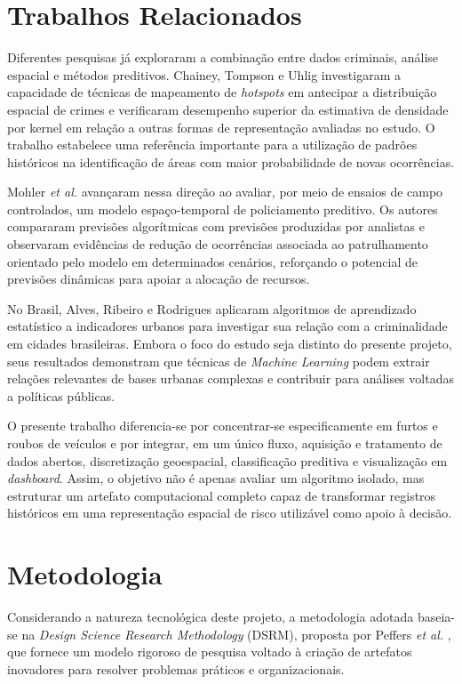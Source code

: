 \documentclass[12pt]{article}
\begin{document}
\section{Trabalhos Relacionados}
Diferentes pesquisas já exploraram a combinação entre dados criminais, análise espacial e métodos preditivos. Chainey, Tompson e Uhlig \cite{chainey2008} investigaram a capacidade de técnicas de mapeamento de \textit{hotspots} em antecipar a distribuição espacial de crimes e verificaram desempenho superior da estimativa de densidade por kernel em relação a outras formas de representação avaliadas no estudo. O trabalho estabelece uma referência importante para a utilização de padrões históricos na identificação de áreas com maior probabilidade de novas ocorrências.

Mohler \textit{et al.} \cite{mohler2015} avançaram nessa direção ao avaliar, por meio de ensaios de campo controlados, um modelo espaço-temporal de policiamento preditivo. Os autores compararam previsões algorítmicas com previsões produzidas por analistas e observaram evidências de redução de ocorrências associada ao patrulhamento orientado pelo modelo em determinados cenários, reforçando o potencial de previsões dinâmicas para apoiar a alocação de recursos.

No Brasil, Alves, Ribeiro e Rodrigues \cite{alves2018} aplicaram algoritmos de aprendizado estatístico a indicadores urbanos para investigar sua relação com a criminalidade em cidades brasileiras. Embora o foco do estudo seja distinto do presente projeto, seus resultados demonstram que técnicas de \textit{Machine Learning} podem extrair relações relevantes de bases urbanas complexas e contribuir para análises voltadas a políticas públicas.

O presente trabalho diferencia-se por concentrar-se especificamente em furtos e roubos de veículos e por integrar, em um único fluxo, aquisição e tratamento de dados abertos, discretização geoespacial, classificação preditiva e visualização em \textit{dashboard}. Assim, o objetivo não é apenas avaliar um algoritmo isolado, mas estruturar um artefato computacional completo capaz de transformar registros históricos em uma representação espacial de risco utilizável como apoio à decisão.

\section{Metodologia}
Considerando a natureza tecnológica deste projeto, a metodologia adotada baseia-se na \textit{Design Science Research Methodology} (DSRM), proposta por Peffers \textit{et al.} \cite{peffers2007}, que fornece um modelo rigoroso de pesquisa voltado à criação de artefatos inovadores para resolver problemas práticos e organizacionais.
\end{document}
